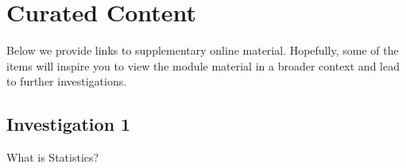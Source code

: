 \documentclass[
  a4paper,
  DIV=11,
  numbers=noendperiod,
  oneside]{scrreprt}
\theoremstyle{definition}
\theoremstyle{definition}
\theoremstyle{plain}
\theoremstyle{plain}
\theoremstyle{definition}
\theoremstyle{remark}
\begin{document}
\endgroup

\cleardoublepage
{}
{}
\appendix

\chapter*{Curated Content}\label{curated-content}


Below we provide links to supplementary online material. Hopefully, some
of the items will inspire you to view the module material in a broader
context and lead to further investigations.

\section*{Investigation 1}\label{investigation-1}


What is Statistics?
\end{document}
